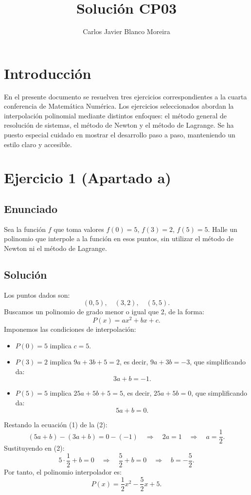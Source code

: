 \documentclass[12pt]{article}
\title{Solución CP03}
\author{Carlos Javier Blanco Moreira}
\begin{document}
	
	\maketitle
	
	\section*{Introducción}
	En el presente documento se resuelven tres ejercicios correspondientes a la cuarta conferencia de Matemática Numérica. Los ejercicios seleccionados abordan la interpolación polinomial mediante distintos enfoques: el método general de resolución de sistemas, el método de Newton y el método de Lagrange. Se ha puesto especial cuidado en mostrar el desarrollo paso a paso, manteniendo un estilo claro y accesible.
	
	\section{Ejercicio 1 (Apartado a)}
	
	\subsection{Enunciado}
	Sea la función \( f \) que toma valores \( f(0) = 5 \), \( f(3) = 2 \), \( f(5) = 5 \). Halle un polinomio que interpole a la función en esos puntos, sin utilizar el método de Newton ni el método de Lagrange.
	
	\subsection{Solución}
	Los puntos dados son:
	\[
	(0,5),\quad (3,2),\quad (5,5).
	\]
	Buscamos un polinomio de grado menor o igual que 2, de la forma:
	\[
	P(x) = ax^2 + bx + c.
	\]
	Imponemos las condiciones de interpolación:
	
	\begin{itemize}
		\item \( P(0) = 5 \) implica \( c = 5 \).
		\item \( P(3) = 2 \) implica \( 9a + 3b + 5 = 2 \), es decir, \( 9a + 3b = -3 \), que simplificando da:
		\[
		3a + b = -1. \tag{1}
		\]
		\item \( P(5) = 5 \) implica \( 25a + 5b + 5 = 5 \), es decir, \( 25a + 5b = 0 \), que simplificando da:
		\[
		5a + b = 0. \tag{2}
		\]
	\end{itemize}
	
	Restando la ecuación (1) de la (2):
	\[
	(5a + b) - (3a + b) = 0 - (-1) \quad \Rightarrow \quad 2a = 1 \quad \Rightarrow \quad a = \frac{1}{2}.
	\]
	Sustituyendo en (2):
	\[
	5 \cdot \frac{1}{2} + b = 0 \quad \Rightarrow \quad \frac{5}{2} + b = 0 \quad \Rightarrow \quad b = -\frac{5}{2}.
	\]
	Por tanto, el polinomio interpolador es:
	\[
	\boxed{P(x) = \frac{1}{2}x^2 - \frac{5}{2}x + 5}.
	\]
	
\end{document}
